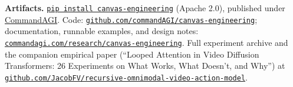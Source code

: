 \documentclass[10pt,twocolumn]{article}
\newcommand{\code}[1]{\texttt{\small #1}}
\begin{document}
\vspace{0.4em}
\noindent\small\textbf{Artifacts.} \href{https://pypi.org/project/canvas-engineering/}{\code{pip install canvas-engineering}} (Apache 2.0), published under \href{https://commandagi.com}{CommandAGI}. Code: \href{https://github.com/commandAGI/canvas-engineering}{\texttt{github.com/commandAGI/canvas-engineering}}; documentation, runnable examples, and design notes: \href{https://commandagi.com/research/canvas-engineering}{\texttt{commandagi.com/research/canvas-engineering}}. Full experiment archive and the companion empirical paper (``Looped Attention in Video Diffusion Transformers: 26 Experiments on What Works, What Doesn't, and Why'') at \href{https://github.com/JacobFV/recursive-omnimodal-video-action-model}{\texttt{github.com/JacobFV/recursive-omnimodal-video-action-model}}.

{\small


}
\end{document}
